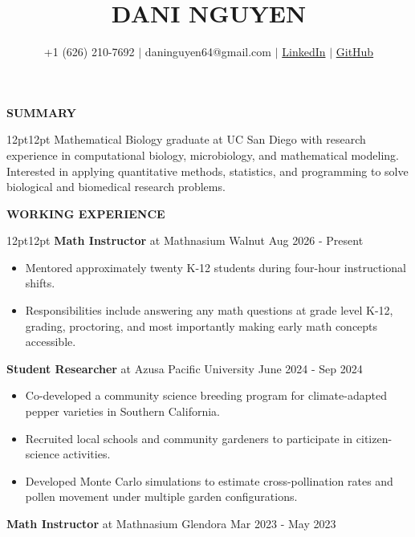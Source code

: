 \documentclass{resumeDaniNguyen}
\title{\LARGE \textbf{DANI NGUYEN}}
\author{\normalsize +1 (626) 210-7692 
$\vert$ daninguyen64@gmail.com 
$\vert$ \href{https://www.linkedin.com/in/daninguyen64/}{LinkedIn}
$\vert$ \href{https://github.com/daninguyen64}{GitHub}}
\date{}
\begin{document}
\maketitle

\vspace{-4em}\textbf{\large SUMMARY} \xrfill[3pt]{1pt} \\[-6pt]
\begin{adjustwidth}{12pt}{12pt}
Mathematical Biology graduate at UC San Diego with research experience in
computational biology, microbiology, and mathematical modeling. Interested 
in applying quantitative methods, statistics, and programming to solve 
biological and biomedical research problems. \\[-5pt]
\end{adjustwidth} 

\textbf{\large WORKING EXPERIENCE} \xrfill[3pt]{1pt} \\[-6pt]
\begin{adjustwidth}{12pt}{12pt}
{\large \textbf{Math Instructor} at Mathnasium Walnut} \hfill Aug 2026 - Present
\begin{itemize}
    \item Mentored approximately twenty K-12 students during four-hour instructional shifts.
    \item Responsibilities include answering any math questions at grade
    level K-12, grading, proctoring, and most importantly making
    early math concepts accessible.
\end{itemize}
{\large \textbf{Student Researcher} at Azusa Pacific University} \hfill June 2024 - Sep 2024 
\begin{itemize}
    \item Co-developed a community science breeding program for climate-adapted pepper 
    varieties in Southern California.
    \item Recruited local schools and community gardeners to participate in
    citizen-science activities.
    \item Developed Monte Carlo simulations to estimate cross-pollination rates and pollen 
    movement under multiple garden configurations.
\end{itemize}
{\large \textbf{Math Instructor} at Mathnasium Glendora} \hfill Mar 2023 - May 2023 \\[-5pt]
\end{adjustwidth}
\end{document}
